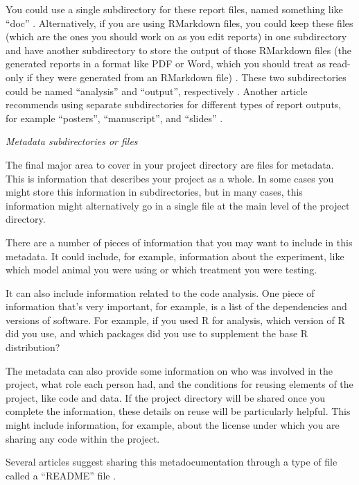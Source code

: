 \documentclass[]{tufte-book}
\begin{document}
You could use a single subdirectory for these report files, named something like
``doc'' \citep{prodigenr, noble2009quick}. Alternatively, if you are using RMarkdown
files, you could keep these files (which are the ones you should work on as you
edit reports) in one subdirectory and have another subdirectory to store the
output of those RMarkdown files (the generated reports in a format like PDF or
Word, which you should treat as read-only if they were generated from an
RMarkdown file) \citep{blischak2019creating}. These two subdirectories could be named
``analysis'' and ``output'', respectively \citep{blischak2019creating}. Another article
recommends using separate subdirectories for different types of report outputs,
for example ``posters'', ``manuscript'', and ``slides'' \citep{vuorre2021sharing}.

\emph{Metadata subdirectories or files}

The final major area to cover in your project directory are files for metadata.
This is information that describes your project as a whole. In some cases you
might store this information in subdirectories, but in many cases, this
information might alternatively go in a single file at the main level of the
project directory.

There are a number of pieces of information that you may want to include in this
metadata. It could include, for example, information about the experiment, like
which model animal you were using or which treatment you were testing.

It can also include information related to the code analysis. One piece of
information that's very important, for example, is a list of the dependencies
and versions of software. For example, if you used R for analysis, which version
of R did you use, and which packages did you use to supplement the base R
distribution?

The metadata can also provide some information on who was involved
in the project, what role each person had, and the conditions for reusing
elements of the project, like code and data. If the project directory will
be shared once you complete the information, these details on reuse will be
particularly helpful. This might include information, for example, about the
license under which you are sharing any code within the project.

Several articles suggest sharing this metadocumentation through a type of file
called a ``README'' file \citep{marwick2018packaging, bertin2021creating, prodigenr}.
\end{document}
